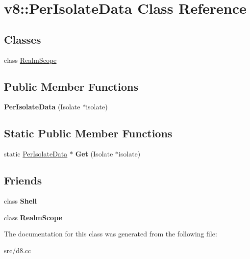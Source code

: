 \hypertarget{classv8_1_1_per_isolate_data}{}\section{v8\+:\+:Per\+Isolate\+Data Class Reference}
\label{classv8_1_1_per_isolate_data}
\subsection*{Classes}
\begin{DoxyCompactItemize}
\item 
class \hyperlink{classv8_1_1_per_isolate_data_1_1_realm_scope}{Realm\+Scope}
\end{DoxyCompactItemize}
\subsection*{Public Member Functions}
\begin{DoxyCompactItemize}
\item 
\hypertarget{classv8_1_1_per_isolate_data_aa17501de2d70dd2fc3e7cbbe32f9b182}{}{\bfseries Per\+Isolate\+Data} (Isolate $\ast$isolate)\label{classv8_1_1_per_isolate_data_aa17501de2d70dd2fc3e7cbbe32f9b182}

\end{DoxyCompactItemize}
\subsection*{Static Public Member Functions}
\begin{DoxyCompactItemize}
\item 
\hypertarget{classv8_1_1_per_isolate_data_adb0772e04fefdf4c51d199539b5eba5a}{}static \hyperlink{classv8_1_1_per_isolate_data}{Per\+Isolate\+Data} $\ast$ {\bfseries Get} (Isolate $\ast$isolate)\label{classv8_1_1_per_isolate_data_adb0772e04fefdf4c51d199539b5eba5a}

\end{DoxyCompactItemize}
\subsection*{Friends}
\begin{DoxyCompactItemize}
\item 
\hypertarget{classv8_1_1_per_isolate_data_a7edf259cb12b10b3f2b1af7cf09d5664}{}class {\bfseries Shell}\label{classv8_1_1_per_isolate_data_a7edf259cb12b10b3f2b1af7cf09d5664}

\item 
\hypertarget{classv8_1_1_per_isolate_data_a166fdcf1c9579470126f36582a059e3c}{}class {\bfseries Realm\+Scope}\label{classv8_1_1_per_isolate_data_a166fdcf1c9579470126f36582a059e3c}

\end{DoxyCompactItemize}


The documentation for this class was generated from the following file\+:\begin{DoxyCompactItemize}
\item 
src/d8.\+cc\end{DoxyCompactItemize}
